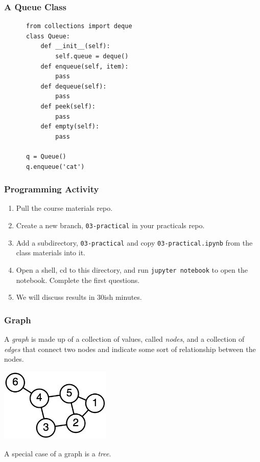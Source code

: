 \documentclass[10pt]{beamer}
\begin{document}
\begin{frame}[fragile]
  \frametitle{A Queue Class}
   
  	
	\begin{verbatim}
      from collections import deque
      class Queue:
          def __init__(self):
              self.queue = deque()
          def enqueue(self, item):
              pass
          def dequeue(self):
              pass
          def peek(self):
              pass
          def empty(self):
              pass
              
      q = Queue()
      q.enqueue('cat')        
    \end{verbatim}  
\end{frame}

\begin{frame}
  \frametitle{Programming Activity}
  
  \begin{enumerate}
    \item Pull the course materials repo.
    \item Create a new branch, \texttt{03-practical} in your practicals repo.
    \item Add a subdirectory,  \texttt{03-practical} and copy \texttt{03-practical.ipynb} from the class materials into it.
    \item Open a shell, cd to this directory, and run \texttt{jupyter notebook} to open the notebook. Complete the first questions.
    \item We will discuss results in 30ish minutes.
  \end{enumerate}      
\end{frame}

\begin{frame}
  \frametitle{Graph}
  A \emph{graph} is made up of a collection of values, called \emph{nodes}, and a
  collection of \emph{edges} that connect two nodes and indicate some sort of relationship between
  the nodes.
  
    
  \includegraphics[height=35mm]{6n-graf.png}
  
  
  A special case of a graph is a \emph{tree}.

\end{frame}
\end{document}
